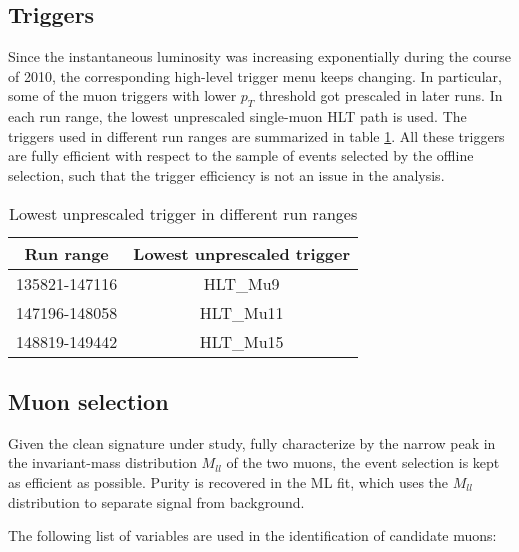 \documentclass{cmspaper}
\begin{document}
\subsection{Triggers}

Since the instantaneous luminosity was increasing exponentially during
the course of 2010, the corresponding high-level trigger menu keeps
changing.  In particular, some of the muon triggers with lower $p_T$
threshold got prescaled in later runs.  In each run range, the lowest
unprescaled single-muon HLT path is used.  The triggers used in
different run ranges are summarized in table \ref{Table_TriggerUsed}.
All these triggers are fully efficient with respect to the sample of
events selected by the offline selection, such that the trigger
efficiency is not an issue in the analysis.

\begin{table}[htbp]
   \caption{Lowest unprescaled trigger in different run ranges}
   \centering
   \begin{tabular}{|c|c|}
   \hline
   Run range & Lowest unprescaled trigger \\\hline
   135821-147116 & HLT\_Mu9 \\\hline
   147196-148058 & HLT\_Mu11 \\\hline
   148819-149442 & HLT\_Mu15 \\\hline
   \end{tabular}
   \label{Table_TriggerUsed}
\end{table}

\subsection{Muon selection}

Given the clean signature under study, fully characterize by the
narrow peak in the invariant-mass distribution $M_{ll}$ of the two
muons, the event selection is kept as efficient as possible.  Purity
is recovered in the ML fit, which uses the $M_{ll}$ distribution to
separate signal from background.

The following list of variables are used in the identification of
candidate muons:
\end{document}
